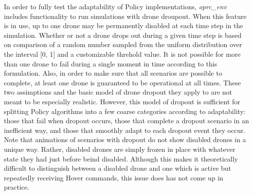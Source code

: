 In order to fully test the adaptability of Policy implementations, \textit{oprc\_env} includes functionality to run simulations with drone droupout. When this feature is in use, up to one drone may be permanently disabled at each time step in the simulation. Whether or not a drone drops out during a given time step is based on comparison of a random number sampled from the uniform distribution over the interval [0, 1] and a customizable threhold value. It is not possible for more than one drone to fail during a single moment in time according to this formulation. Also, in order to make sure that all scenarios are possible to complete, at least one drone is guaranteed to be operational at all times. These two assimptions and the basic model of drone dropout they apply to are not meant to be especially realistic. However, this model of dropout is sufficient for splitting Policy algorithms into a few coarse categories according to adaptability: those that fail when dropout occurs, those that complete a dropout scenario in an inefficient way, and those that smoothly adapt to each dropout event they occur. Note that animations of scenarios with dropout do not show disabled drones in a unique way. Rather, disabled drones are simply frozen in place with whatever state they had just before beind disabled. Although this makes it theoretically difficult to distinguish between a disabled drone and one which is active but repeatedly receiving Hover commands, this issue does has not come up in practice.

